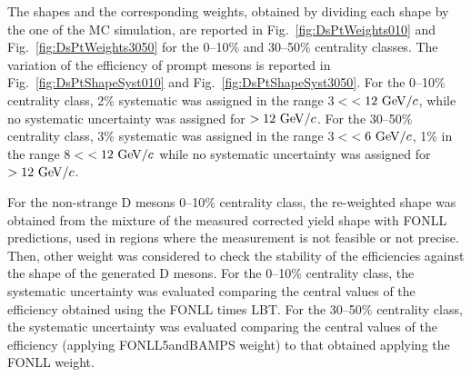 The \pt shapes and the corresponding \pt weights, obtained by dividing each shape by the one of the MC simulation, are reported in Fig.~\ref{fig:DsPtWeights010} and Fig.~\ref{fig:DsPtWeights3050} for the 0--10\% and 30--50\% centrality classes. The variation of the efficiency of prompt \Dsubs mesons is reported in Fig.~\ref{fig:DsPtShapeSyst010} and Fig.~\ref{fig:DsPtShapeSyst3050}. For the 0--10\% centrality class, 2\% systematic was assigned in the range $3<$\pt$<12~{\rm GeV}/c$, while no systematic uncertainty was assigned for \pt$>12~{\rm GeV}/c$.
For the 30--50\% centrality class, 3\% systematic was assigned in the range $3<$\pt$<6~{\rm GeV}/c$, 1\%  in the range $8<$\pt$<12~{\rm GeV}/c$ while no systematic uncertainty was assigned for \pt$>12~{\rm GeV}/c$.

For the non-strange D mesons 0--10\% centrality class, the re-weighted shape was obtained from the mixture of the measured \Dzero corrected yield shape with FONLL predictions, used in \pt regions where the measurement is not feasible or not precise. Then, other \pt weight was considered to check the stability of the efficiencies against the \pt shape of the generated D mesons. For the 0--10\% centrality class, the systematic uncertainty was evaluated comparing the central values of the efficiency obtained using the FONLL times LBT. For the 30--50\% centrality class, the systematic uncertainty was evaluated comparing the central values of the efficiency (applying FONLL5andBAMPS weight) to that obtained applying the FONLL weight.



